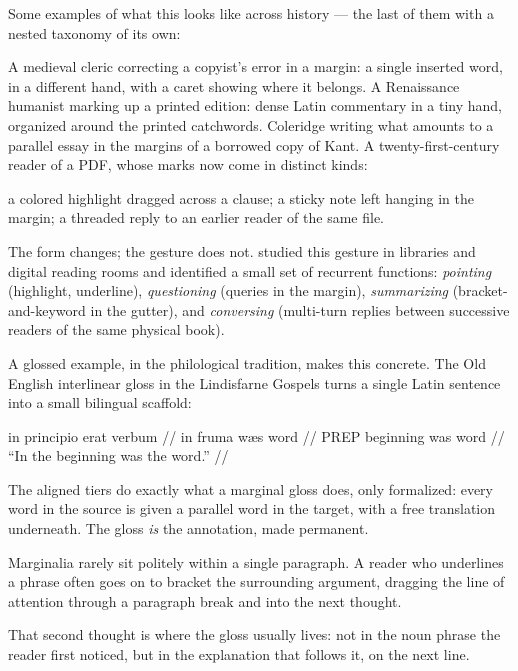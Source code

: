 \documentclass{article}
\providecommand{\vcid}[1]{}
\providecommand{\vexid}[1]{}
\providecommand{\vxid}[1]{}
\providecommand{\vlid}[1]{}
\providecommand{\vlidend}[1]{}
\begin{document}
Some examples of what this looks like across history --- the last of them with a nested taxonomy of its own: %

\vexid{ee02}\pex\label{ex:reader-types}
\vxid{ea01}\a A medieval cleric correcting a copyist's error in a margin: a single inserted word, in a different hand, with a caret showing where it belongs.
\vxid{ea02}\a A Renaissance humanist marking up a printed edition: dense Latin commentary in a tiny hand, organized around the printed catchwords.
\vxid{ea03}\a Coleridge writing what amounts to a parallel essay in the margins of a borrowed copy of Kant.
\vxid{ea04}\a A twenty-first-century reader of a PDF, whose marks now come in distinct kinds:
\begin{xlist}
\vxid{eb01}\a a colored highlight dragged across a clause;
\vxid{eb02}\a a sticky note left hanging in the margin;
\vxid{eb03}\a a threaded reply to an earlier reader of the same file.
\end{xlist}
\xe

The form changes; the gesture does not. \vcid{cc10}\citet{marshall1997,marshall1998} studied this gesture in libraries and digital reading rooms and identified a small set of recurrent functions: \emph{pointing} (highlight, underline), \emph{questioning} (queries in the margin), \emph{summarizing} (bracket-and-keyword in the gutter), and \emph{conversing} (multi-turn replies between successive readers of the same physical book). %

A glossed example, in the philological tradition, makes this concrete. The Old English interlinear gloss in the Lindisfarne Gospels turns a single Latin sentence into a small bilingual scaffold: %

\vexid{ee03}\ex\label{ex:old-english-gloss}
\begingl
\gla in principio erat verbum //
\glb in fruma wæs word //
\glc PREP beginning was word //
\glft ``In the beginning was the word.'' //
\endgl
\xe

The aligned tiers do exactly what a marginal gloss does, only formalized: every word in the source is given a parallel word in the target, with a free translation underneath. The gloss \emph{is} the annotation, made permanent. %

Marginalia rarely sit politely within a single paragraph. \vlid{ab12}A reader who underlines a phrase often goes on to bracket the surrounding argument, dragging the line of attention through a paragraph break and into the next thought.\vlidend{ab12} %

\vlid{ab12}That second thought is where the gloss usually lives: not in the noun phrase the reader first noticed, but in the explanation that follows it, on the next line.\vlidend{ab12} %
\end{document}
